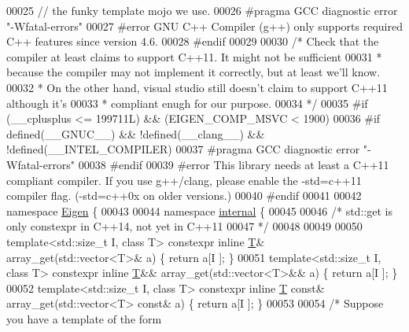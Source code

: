 \begin{DoxyCode}
00025 \textcolor{comment}{// the funky template mojo we use.}
00026 \textcolor{preprocessor}{#pragma GCC diagnostic error "-Wfatal-errors"}
00027 \textcolor{preprocessor}{#error GNU C++ Compiler (g++) only supports required C++ features since version 4.6.}
00028 \textcolor{preprocessor}{#endif}
00029 
00030 \textcolor{comment}{/* Check that the compiler at least claims to support C++11. It might not be sufficient}
00031 \textcolor{comment}{ * because the compiler may not implement it correctly, but at least we'll know.}
00032 \textcolor{comment}{ * On the other hand, visual studio still doesn't claim to support C++11 although it's}
00033 \textcolor{comment}{ * compliant enugh for our purpose.}
00034 \textcolor{comment}{ */}
00035 \textcolor{preprocessor}{#if (\_\_cplusplus <= 199711L) && (EIGEN\_COMP\_MSVC < 1900)}
00036 \textcolor{preprocessor}{#if defined(\_\_GNUC\_\_) && !defined(\_\_clang\_\_) && !defined(\_\_INTEL\_COMPILER)}
00037 \textcolor{preprocessor}{#pragma GCC diagnostic error "-Wfatal-errors"}
00038 \textcolor{preprocessor}{#endif}
00039 \textcolor{preprocessor}{#error This library needs at least a C++11 compliant compiler. If you use g++/clang, please enable the
       -std=c++11 compiler flag. (-std=c++0x on older versions.)}
00040 \textcolor{preprocessor}{#endif}
00041 
00042 \textcolor{keyword}{namespace }\hyperlink{namespace_eigen}{Eigen} \{
00043 
00044 \textcolor{keyword}{namespace }\hyperlink{namespaceinternal}{internal} \{
00045 
00046 \textcolor{comment}{/* std::get is only constexpr in C++14, not yet in C++11}
00047 \textcolor{comment}{ */}
00048 
00049 
00050 \textcolor{keyword}{template}<std::\textcolor{keywordtype}{size\_t} I, \textcolor{keyword}{class} T> constexpr \textcolor{keyword}{inline} \hyperlink{group___sparse_core___module_class_eigen_1_1_triplet}{T}&       array\_get(std::vector<T>&       a) \{ \textcolor{keywordflow}{return} a[I
      ]; \}
00051 \textcolor{keyword}{template}<std::\textcolor{keywordtype}{size\_t} I, \textcolor{keyword}{class} T> constexpr \textcolor{keyword}{inline} \hyperlink{group___sparse_core___module_class_eigen_1_1_triplet}{T}&&      array\_get(std::vector<T>&&      a) \{ \textcolor{keywordflow}{return} a[I
      ]; \}
00052 \textcolor{keyword}{template}<std::\textcolor{keywordtype}{size\_t} I, \textcolor{keyword}{class} T> constexpr \textcolor{keyword}{inline} \hyperlink{group___sparse_core___module_class_eigen_1_1_triplet}{T} \textcolor{keyword}{const}& array\_get(std::vector<T> \textcolor{keyword}{const}& a) \{ \textcolor{keywordflow}{return} a[I
      ]; \}
00053 
00054 \textcolor{comment}{/* Suppose you have a template of the form}

\end{DoxyCode}
